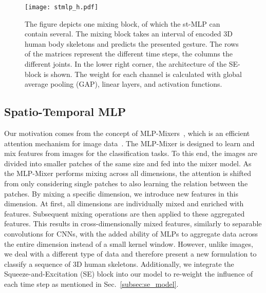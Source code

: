 \documentclass[letterpaper, 10 pt, conference]{ieeeconf}
\begin{document}
\begin{figure}[!ht]
\vspace{2mm}
    \centering
    \texttt{[image: stmlp\_h.pdf]}
    \caption{The figure depicts one mixing block, of which the st-MLP can contain several. The mixing block takes an interval of encoded 3D human body skeletons and predicts the presented gesture. The rows of the matrices represent the different time steps, the columns the different joints. In the lower right corner, the architecture of the SE-block is shown. The weight for each channel is calculated with global average pooling (GAP), linear layers, and activation functions.}
    \label{fig:st_mlp}
\end{figure}


\subsection{Spatio-Temporal MLP}
\label{subsec:mlp_gesture_recognition}

Our motivation comes from the concept of MLP-Mixers~\cite{tolstikhin2021mlp}, which is an efficient attention mechanism for image data~\cite{vaswani2017attention, dosovitskiy2020image}. The MLP-Mixer is designed to learn and mix features from images for the classification tasks. To this end, the images are divided into smaller patches of the same size and fed into the mixer model. As the MLP-Mixer performs mixing across all dimensions, the attention is shifted from only considering single patches to also learning the relation between the patches. By mixing a specific dimension, we introduce new features in this dimension. At first, all dimensions are individually mixed and enriched with features. Subsequent mixing operations are then applied to these aggregated features. This results in cross-dimensionally mixed features, similarly to separable convolutions for CNNs, with the added ability of MLPs to aggregate data across the entire dimension instead of a small kernel window. However, unlike images, we deal with a different type of data and therefore present a new formulation to classify a sequence of 3D human skeletons. Additionally, we integrate the Squeeze-and-Excitation (SE) block into our model to re-weight the influence of each time step as mentioned in Sec.~\ref{subsec:se_model}.
\end{document}
